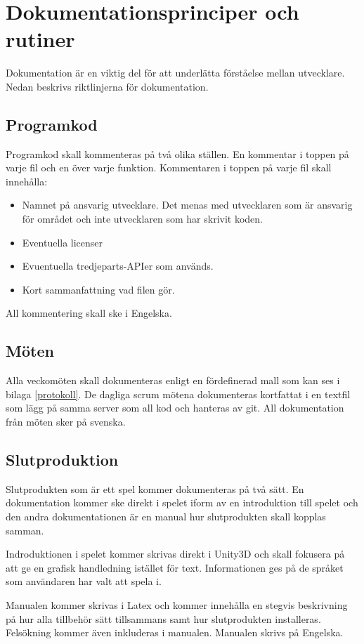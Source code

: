 \documentclass[a4paper,12pt,oneside,final]{extbook}
\begin{document}
\section{Dokumentationsprinciper och rutiner}
Dokumentation är en viktig del för att underlätta förståelse mellan utvecklare. Nedan beskrivs riktlinjerna för dokumentation.

\subsection{Programkod}
Programkod skall kommenteras på två olika ställen. En kommentar i toppen på varje fil och en över varje funktion. Kommentaren i toppen på varje fil skall innehålla:
\begin{itemize}
	\item Namnet på ansvarig utvecklare. Det menas med utvecklaren som är ansvarig för området och inte utvecklaren som har skrivit koden.
	\item Eventuella licenser
	\item Evuentuella tredjeparts-APIer som används.
	\item Kort sammanfattning vad filen gör.
\end{itemize}
All kommentering skall ske i Engelska.
\subsection{Möten}
Alla veckomöten skall dokumenteras enligt en fördefinerad mall som kan ses i bilaga \ref{protokoll}. De dagliga scrum mötena dokumenteras kortfattat i en textfil som lägg på samma server som all kod och hanteras av git. All dokumentation från möten sker på svenska.
\subsection{Slutproduktion}
Slutprodukten som är ett spel kommer dokumenteras på två sätt. En dokumentation kommer ske direkt i spelet iform av en introduktion till spelet och den andra dokumentationen är en manual hur slutprodukten skall kopplas samman. 

Indroduktionen i spelet kommer skrivas direkt i Unity3D och skall fokusera på att ge en grafisk handledning istället för text. Informationen ges på de språket som användaren har valt att spela i.

Manualen kommer skrivas i Latex och kommer innehålla en stegvis beskrivning på hur alla tillbehör sätt tillsammans samt hur slutprodukten installeras. Felsökning kommer även inkluderas i manualen. Manualen skrivs på Engelska.
\end{document}
